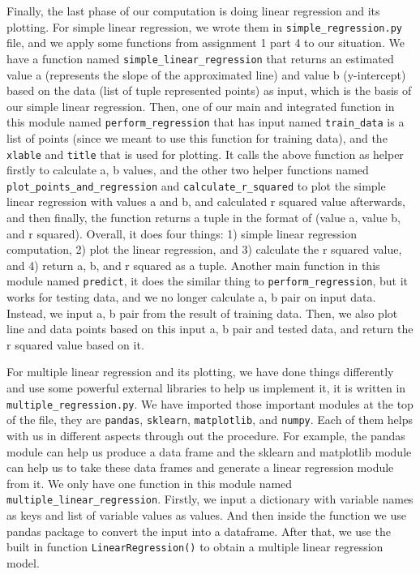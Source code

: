 \documentclass[fontsize=11pt]{article}
\begin{document}
 
Finally, the last phase of our computation is doing linear regression and its plotting. For simple linear regression, we wrote them in \texttt{simple\_regression.py} file, and we apply some functions from assignment 1 part 4 to our situation. We have a function named \texttt{simple\_linear\_regression} that returns an estimated value a (represents the slope of the approximated line) and value b (y-intercept) based on the data (list of tuple represented points) as input, which is the basis of our simple linear regression. Then, one of our main and integrated function in this module named \texttt{perform\_regression} that has input named \texttt{train\_data} is a list of points (since we meant to use this function for training data), and the \texttt{xlable} and \texttt{title} that is used for plotting. It calls the above function as helper firstly to calculate a, b values, and the other two helper functions named 
\texttt{plot\_points\_and\_regression} and \texttt{calculate\_r\_squared} to plot the simple linear regression with values a and b, and calculated r squared value afterwards, and then finally, the function returns a tuple in the format of (value a, value b, and r squared). Overall, it does four things: 1) simple linear regression computation, 2) plot the linear regression, and 3) calculate the r squared value, and 4) return a, b, and r squared as a tuple. Another main function in this module named \texttt{predict}, it does the similar thing to \texttt{perform\_regression}, but it works for testing data, and we no longer calculate a, b pair on input data. Instead, we input a, b pair from the result of training data. Then, we also plot line and data points based on this input a, b pair and tested data, and return the r squared value based on it.

For multiple linear regression and its plotting, we have done things differently and use some powerful external libraries to help us implement it, it is written in \texttt{multiple\_regression.py}. We have imported those important modules at the top of the file, they are \texttt{pandas}, \texttt{sklearn}, \texttt{matplotlib}, and \texttt{numpy}. Each of them helps with us in different aspects through out the procedure. For example, the pandas module can help us produce a data frame and the sklearn and matplotlib module can help us to take these data frames and generate a linear regression module from it.  We only have one function in this module named \texttt{multiple\_linear\_regression}. Firstly, we input a dictionary with variable names as keys and list of variable values as values. And then inside the function we use pandas package to convert the input into a dataframe. After that, we use the built in function \texttt{LinearRegression()} to obtain a multiple linear regression model.
\end{document}

